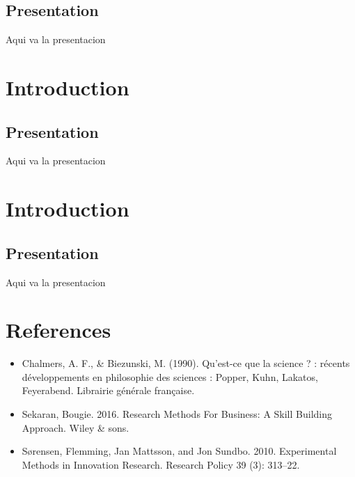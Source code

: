 \documentclass[
]{book}
\begin{document}
\hypertarget{presentation-1}{%
\section{Presentation}\label{presentation-1}}

Aqui va la presentacion

\hypertarget{introduction-2}{%
\chapter{Introduction}\label{introduction-2}}

\hypertarget{presentation-2}{%
\section{Presentation}\label{presentation-2}}

Aqui va la presentacion

\hypertarget{introduction-3}{%
\chapter{Introduction}\label{introduction-3}}

\hypertarget{presentation-3}{%
\section{Presentation}\label{presentation-3}}

Aqui va la presentacion

\hypertarget{references}{%
\chapter{References}\label{references}}

\begin{itemize}
\item
  Chalmers, A. F., \& Biezunski, M. (1990). Qu'est-ce que la science ? : récents développements en philosophie des sciences : Popper, Kuhn, Lakatos, Feyerabend. Librairie générale française.
\item
  Sekaran, Bougie. 2016. Research Methods For Business: A Skill Building Approach. Wiley \& sons.
\item
  Sørensen, Flemming, Jan Mattsson, and Jon Sundbo. 2010. Experimental Methods in Innovation Research. Research Policy 39 (3): 313--22.
\end{itemize}

  
\end{document}
